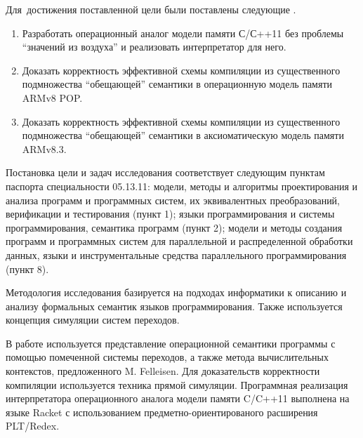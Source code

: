 Для~достижения поставленной цели были поставлены следующие {\tasks}.
\begin{enumerate}
  \item Разработать операционный аналог модели памяти С/С++11 без проблемы ``значений из воздуха'' и реализовать интерпретатор для него.
  \item Доказать корректность эффективной схемы компиляции из существенного подмножества ``обещающей'' семантики в операционную модель памяти ARMv8 POP.
  \item Доказать корректность эффективной схемы компиляции из существенного подмножества ``обещающей'' семантики в аксиоматическую модель памяти ARMv8.3.
\end{enumerate}

Постановка цели и задач исследования соответствует следующим пунктам паспорта специальности 05.13.11:
модели, методы и алгоритмы проектирования и анализа программ и программных систем, их эквивалентных преобразований, верификации и тестирования (пункт 1);
языки программирования и системы программирования, семантика программ (пункт 2);
модели и методы создания программ и программных систем для параллельной и распределенной обработки данных,
языки и инструментальные средства параллельного программирования (пункт 8).

{\methods}
Методология исследования базируется на подходах информатики
к описанию и анализу формальных семантик языков программирования.
Также используется концепция симуляции систем переходов.

В работе используется представление операционной семантики программы с помощью помеченной системы переходов, а также
метода вычислительных контекстов, предложенного M. Felleisen.
Для доказательств корректности компиляции используется техника прямой симуляции.
Программная реализация интерпретатора операционного аналога модели памяти C/C++11 выполнена на языке Racket с использованием
предметно-ориентированого расширения PLT/Redex.

